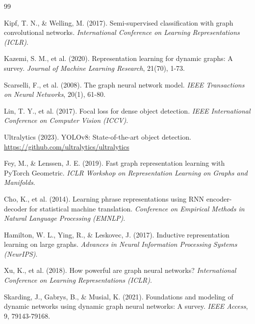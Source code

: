 \documentclass[10pt,a4paper]{report}
\begin{document}
\begin{thebibliography}{99}

Kipf, T. N., \& Welling, M. (2017). Semi-supervised classification with graph convolutional networks. \textit{International Conference on Learning Representations (ICLR)}.

Kazemi, S. M., et al. (2020). Representation learning for dynamic graphs: A survey. \textit{Journal of Machine Learning Research}, 21(70), 1-73.

Scarselli, F., et al. (2008). The graph neural network model. \textit{IEEE Transactions on Neural Networks}, 20(1), 61-80.

Lin, T. Y., et al. (2017). Focal loss for dense object detection. \textit{IEEE International Conference on Computer Vision (ICCV)}.

Ultralytics (2023). YOLOv8: State-of-the-art object detection. \url{https://github.com/ultralytics/ultralytics}

Fey, M., \& Lenssen, J. E. (2019). Fast graph representation learning with PyTorch Geometric. \textit{ICLR Workshop on Representation Learning on Graphs and Manifolds}.

Cho, K., et al. (2014). Learning phrase representations using RNN encoder-decoder for statistical machine translation. \textit{Conference on Empirical Methods in Natural Language Processing (EMNLP)}.

Hamilton, W. L., Ying, R., \& Leskovec, J. (2017). Inductive representation learning on large graphs. \textit{Advances in Neural Information Processing Systems (NeurIPS)}.

Xu, K., et al. (2018). How powerful are graph neural networks? \textit{International Conference on Learning Representations (ICLR)}.

Skarding, J., Gabrys, B., \& Musial, K. (2021). Foundations and modeling of dynamic networks using dynamic graph neural networks: A survey. \textit{IEEE Access}, 9, 79143-79168.

\end{thebibliography}
\end{document}
